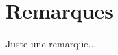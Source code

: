 \section{Remarques}

\begin{doclatex}
	\begin{remark}
		Juste une remarque...
	\end{remark}
\end{doclatex}
